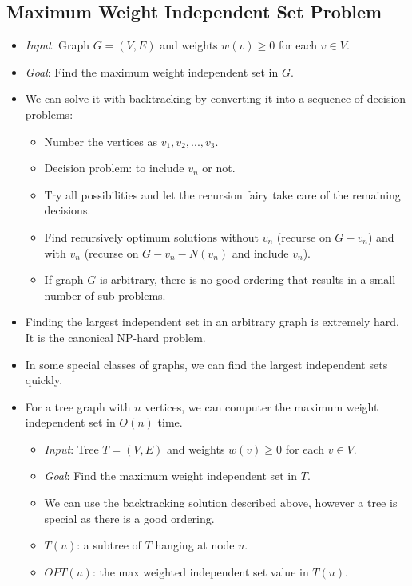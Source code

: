 \documentclass[12pt]{article}
\begin{document}
\subsection{Maximum Weight Independent Set Problem}
\begin{itemize}
    \item \textit{Input}: Graph $G = (V, E)$ and weights $w(v) \geq 0$ for each $v \in V$.
    \item \textit{Goal}: Find the maximum weight independent set in $G$.
    \item We can solve it with backtracking by converting it into a sequence of decision problems:
    \begin{itemize}
        \item Number the vertices as $v_1, v_2, ..., v_3$.
        \item Decision problem: to include $v_n$ or not.
        \item Try all possibilities and let the recursion fairy take care of the remaining decisions.
        \item Find recursively optimum solutions without $v_n$ (recurse on $G - v_n$) and with $v_n$ (recurse on $G - v_n - N(v_n)$ and include $v_n$).
        \item If graph $G$ is arbitrary, there is no good ordering that results in a small number of sub-problems.
    \end{itemize}
    \item Finding the largest independent set in an arbitrary graph is extremely hard. It is the canonical NP-hard problem.
    \item In some special classes of graphs, we can find the largest independent sets quickly.
    \item For a tree graph with $n$ vertices, we can computer the maximum weight independent set in $O(n)$ time.
    \begin{itemize}
        \item \textit{Input}: Tree $T = (V, E)$ and weights $w(v) \geq 0$ for each $v \in V$.
        \item \textit{Goal}: Find the maximum weight independent set in $T$.
        \item We can use the backtracking solution described above, however a tree is special as there is a good ordering.
        \item $T(u)$: a subtree of $T$ hanging at node $u$.
        \item $OPT(u)$: the max weighted independent set value in $T(u)$.
        \begin{equation}

\end{equation}
\end{itemize}
\end{itemize}
\end{document}
